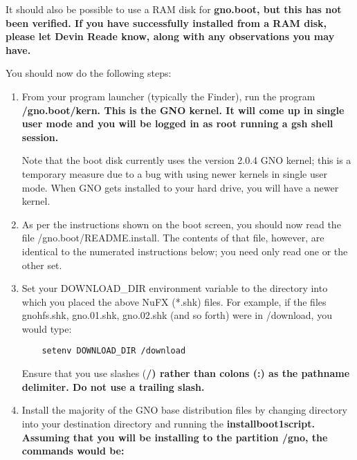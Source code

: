\documentclass{report}
\begin{document}
It should also be possible to use a RAM disk for \bf gno.boot\rm, but
this has not been verified.  If you have successfully installed from a
RAM disk, please let Devin Reade know, along with any observations
you may have.

You should now do the following steps:

\begin{comment}

If your volumes are named something else, replace the names in the cd commands
below with the appropriate name.
 
\end{comment}


\begin{enumerate}

\item
From your program launcher (typically the Finder), run the program
\bf /gno.boot/kern\rm.  This is the GNO kernel.  It will come up in 
single user mode and you will be logged in as root running a \bf gsh\rm
shell session.

Note that the boot disk currently uses the version 2.0.4 GNO kernel; this
is a temporary measure due to a bug with using newer kernels in single user
mode.  When GNO gets installed to your hard drive, you will have a newer
kernel.

\item
As per the instructions shown on the boot screen, you should now read the
file /gno.boot/README.install.  The contents of that file, however, are
identical to the numerated instructions below; you need only read one or
the other set.

\item
Set your DOWNLOAD\_DIR environment variable to the directory
into which you placed the above NuFX (*.shk) files. For example,
if the files gnohfs.shk, gno.01.shk, gno.02.shk (and so forth)
were in /download, you would type:

\begin{verbatim}
	setenv DOWNLOAD_DIR /download
\end{verbatim}

Ensure that you use slashes (\bf/\rm) rather than colons (\bf:\rm) as the
pathname delimiter.  Do not use a trailing slash.

\item
Install the majority of the GNO base distribution files by
changing directory into your destination directory and running
the \bf installboot1\rm script. Assuming that you will be installing
to the partition \bf/gno\rm, the commands would be:


\end{enumerate}
\end{document}
